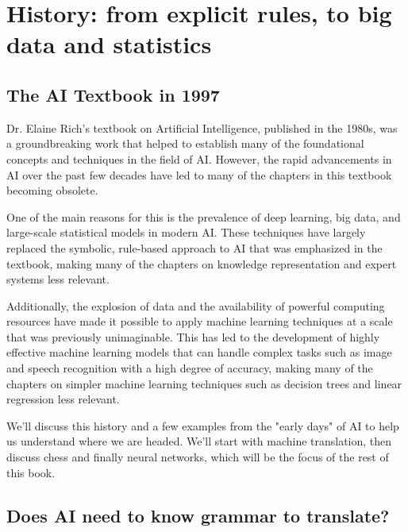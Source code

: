 \setchapterpreamble[u]{\margintoc}
\chapter{History: from explicit rules, to big data and statistics}

\section{The AI Textbook in 1997}

Dr. Elaine Rich's textbook on Artificial Intelligence, published in the 1980s, was a groundbreaking work that helped to establish many of the foundational concepts and techniques in the field of AI. However, the rapid advancements in AI over the past few decades have led to many of the chapters in this textbook becoming obsolete.

One of the main reasons for this is the prevalence of deep learning, big data, and large-scale statistical models in modern AI. These techniques have largely replaced the symbolic, rule-based approach to AI that was emphasized in the textbook, making many of the chapters on knowledge representation and expert systems less relevant.

Additionally, the explosion of data and the availability of powerful computing resources have made it possible to apply machine learning techniques at a scale that was previously unimaginable. This has led to the development of highly effective machine learning models that can handle complex tasks such as image and speech recognition with a high degree of accuracy, making many of the chapters on simpler machine learning techniques such as decision trees and linear regression less relevant.  


We'll discuss this history and a few examples from the "early days" of AI to help us understand where we are headed. We'll start with machine translation, then discuss chess and finally neural networks, which will be the focus of the rest of this book.

\section{Does AI need to know grammar to translate?}

